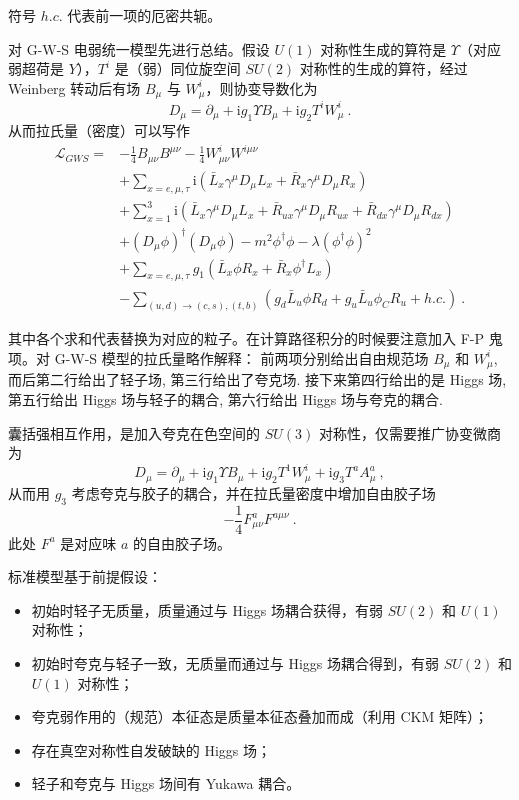 
\begin{issues}
\issueMissDepend
\issueAbstract
\end{issues}

符号 $h.c.$ 代表前一项的厄密共轭。

对 G-W-S 电弱统一模型先进行总结。假设 $U(1)$ 对称性生成的算符是 $\Upsilon$（对应弱超荷是 $Y$），$T^i$ 是（弱）同位旋空间 $SU(2)$ 对称性的生成的算符，经过 Weinberg 转动后有场 $B_\mu$ 与 $W^i_\mu$，则协变导数化为 
\begin{equation}
D_\mu = \partial_\mu + \mathrm i g_1 \Upsilon B_\mu + \mathrm i g_2 T^i W_\mu^i~.
\end{equation}
从而拉氏量（密度）可以写作 
\begin{equation}
	\begin{aligned}
		\mathcal L_{GWS} =& -\frac{1}{4} B_{\mu\nu} B^{\mu\nu} - \frac{1}{4} W_{\mu\nu}^i W^{i\mu\nu}\\
		&+ \sum_{x = e, \mu, \tau} \mathrm i \left(\bar{L}_x \gamma^\mu D_\mu L_x + \bar{R}_x \gamma^\mu D_\mu R_x\right)\\
		&+ \sum_{x=1}^3 \mathrm i \left(\bar{L}_{x} \gamma^\mu D_\mu L_x + \bar{R}_{ux} \gamma^\mu D_\mu R_{ux} + \bar{R}_{dx} \gamma^\mu D_\mu R_{dx}\right) \\
		&+(D_\mu \phi)^\dagger (D_\mu \phi) - m^2 \phi^\dagger \phi - \lambda (\phi^\dagger \phi)^2 \\
		&+ \sum_{x = e, \mu, \tau} g_1 \left(\bar{L}_x \phi R_x + \bar{R}_x \phi^\dagger L_x\right) \\
		&- \sum_{(u, d) \to (c, s), (t, b)} \left(g_d \bar{L}_u \phi R_d + g_u \bar{L}_u \phi_C R_u + h.c.\right) ~.
	\end{aligned}
\end{equation}

其中各个求和代表替换为对应的粒子。在计算路径积分的时候要注意加入 F-P 鬼项。对 G-W-S 模型的拉氏量略作解释：
前两项分别给出自由规范场 $B_\mu$ 和 $W_\mu^i$, 而后第二行给出了轻子场, 第三行给出了夸克场.
接下来第四行给出的是 Higgs 场, 第五行给出 Higgs 场与轻子的耦合, 第六行给出 Higgs 场与夸克的耦合.

囊括强相互作用，是加入夸克在色空间的 $SU(3)$ 对称性，仅需要推广协变微商为 
\begin{equation}
	D_\mu = \partial_\mu + \mathrm i g_1 \Upsilon B_\mu + \mathrm i g_2 T^1 W_\mu^i + \mathrm i g_3 T^a A^a_\mu ~,
\end{equation}
从而用 $g_3$ 考虑夸克与胶子的耦合，并在拉氏量密度中增加自由胶子场
\begin{equation}
	-\frac14 F_{\mu\nu}^a F^{a\mu\nu} ~.
\end{equation}
此处 $F^a$ 是对应味 $a$ 的自由胶子场。

标准模型基于前提假设：
\begin{itemize}
	\item 初始时轻子无质量，质量通过与 Higgs 场耦合获得，有弱 $SU(2)$ 和 $U(1)$ 对称性；
	\item 初始时夸克与轻子一致，无质量而通过与 Higgs 场耦合得到，有弱 $SU(2)$ 和 $U(1)$ 对称性；
	\item 夸克弱作用的（规范）本征态是质量本征态叠加而成（利用 CKM 矩阵）；
	\item 存在真空对称性自发破缺的 Higgs 场；
	\item 轻子和夸克与 Higgs 场间有 Yukawa 耦合。
\end{itemize}
